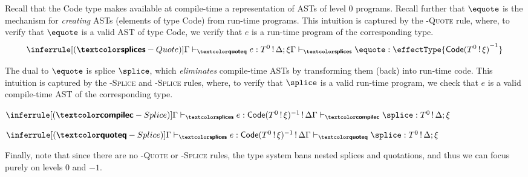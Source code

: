 Recall that the \textsf{Code} type makes available at compile-time a representation of ASTs of level $0$ programs. Recall further that $\equote$ is the mechanism for \textit{creating} ASTs (elements of type \textsf{Code}) from run-time programs. This intuition is captured by the \textsc{\splicemode{}-Quote} rule, where, to verify that $\equote$ is a valid AST of type \textsf{Code}, we verify that $e$ is a run-time program of the corresponding type.
\[\inferrule[(\splicemode{}-Quote)]{\qtypejudge{e}{\runtimecomptype{T}{\Delta ; \xi}}}{\stypejudge{\equote}{\effectType{\compiletimetype{\textsf{Code}(\runtimecomptype{T}{\xi})}}}}\]

The dual to $\equote$ is splice $\splice$, which \textit{eliminates} compile-time ASTs by transforming them (back) into run-time code. This intuition is captured by the \textsc{\quotemode{}-Splice} and \textsc{\compilemode{}-Splice} rules, where, to verify that $\splice$ is a valid run-time program, we check that $e$ is a valid compile-time AST of the corresponding type. 

\begin{center}
\begin{minipage}[t]{0.5\textwidth}
  \centering
  $\inferrule[(\compilemode{}-Splice)]{\stypejudge[\Gamma]{e}{\textsf{Code}(T^0 \, ! \, \xi)^{-1} \, ! \, \Delta}}{\ctypejudge{\splice}{\runtimecomptype{T}{\Delta ; \xi}}}$
\end{minipage}%
\begin{minipage}[t]{0.5\textwidth}
  \centering
  $\inferrule[(\quotemode{}-Splice)]{\stypejudge[\Gamma]{e}{\textsf{Code}(T^0 \, ! \, \xi)^{-1} \, ! \, \Delta}}{\qtypejudge{\splice}{\runtimecomptype{T}{\Delta ; \xi}}}$
\end{minipage}
\end{center}


Finally, note that since there are no \textsc{\quotemode-Quote} or \textsc{\splicemode-Splice} rules, the type system bans nested splices and quotations, and thus we can focus purely on levels $0$ and $-1$. 

